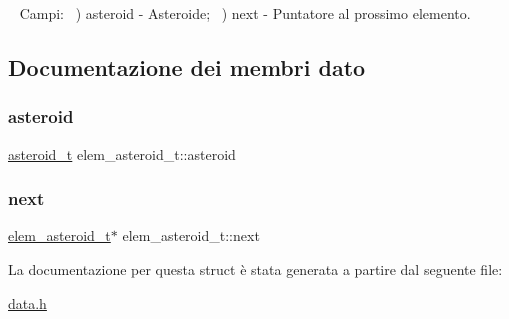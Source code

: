 ~\newline
Campi\+: ~) asteroid -\/ Asteroide; ~) next -\/ Puntatore al prossimo elemento. 

\subsection{Documentazione dei membri dato}
\mbox{\label{structelem__asteroid__t_aada6a67a7d9b0d76f5bc73b82feb1e2a}} 
\subsubsection{\texorpdfstring{asteroid}{asteroid}}
{\footnotesize\ttfamily \hyperlink{structasteroid__t}{asteroid\+\_\+t} elem\+\_\+asteroid\+\_\+t\+::asteroid}

\mbox{\label{structelem__asteroid__t_a5f906717abd1758a220cbb1c1e5e1c9d}} 
\subsubsection{\texorpdfstring{next}{next}}
{\footnotesize\ttfamily \hyperlink{structelem__asteroid__t}{elem\+\_\+asteroid\+\_\+t}$\ast$ elem\+\_\+asteroid\+\_\+t\+::next}



La documentazione per questa struct è stata generata a partire dal seguente file\+:\begin{DoxyCompactItemize}
\item 
\hyperlink{data_8h}{data.\+h}\end{DoxyCompactItemize}
